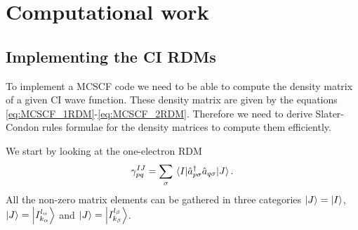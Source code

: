 \documentclass[11pt,a4paper]{article}
\begin{document}
\section{Computational work}
\label{sec:compWork}

\subsection{Implementing the CI RDMs}

To implement a MCSCF code we need to be able to compute the density matrix of a given CI wave function. These density matrix are given by the equations \eqref{eq:MCSCF_1RDM}-\eqref{eq:MCSCF_2RDM}.
Therefore we need to derive Slater-Condon rules formulae for the density matrices to compute them efficiently.

We start by looking at the one-electron RDM
\begin{equation}
  \label{eq:1RDM}
  \gamma_{pq}^{IJ}=\sum_\sigma\mel{I}{\hat{a}_{p\sigma}^\dagger \hat{a}_{q\sigma}}{J}.
\end{equation}
All the non-zero matrix elements can be gathered in three categories $\ket{J}=\ket{I}$, $\ket{J}=\ket{I_{k_\alpha}^{l_\alpha}}$ and $\ket{J}=\ket{I_{k_\beta}^{l_\beta}}$.
\end{document}
